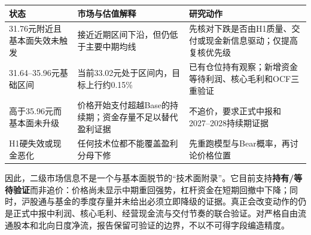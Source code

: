 \begin{exhibitbox}[价格、估值和验证事件的联合纪律]
\small
\begin{tabularx}{\exhibitboxwidth}{L{3.2cm}L{4.2cm}X}
\toprule
\textbf{状态} & \textbf{市场与估值解释} & \textbf{研究动作} \\
\midrule
31.76元附近且基本面失效未触发 & 接近近期区间下沿，但仍低于主要中期均线 & 先核对下跌是否由H1质量、交付或现金新信息驱动；仅提高复核优先级 \\
31.64--35.96元基础区间 & 当前33.02元处于区间内，目标上行约0.15\% & 已有仓位持有观察；新增资金等待利润、核心毛利和OCF三重验证 \\
高于35.96元而基本面未升级 & 价格开始支付超越Base的持续期；资金存量不足以替代盈利证据 & 不追价，要求正式中报和2027--2028持续期证据 \\
H1硬失效或现金恶化 & 任何技术位都不能覆盖盈利分母下修 & 先重跑模型与Bear概率，再讨论价格位置 \\
\bottomrule
\end{tabularx}
\end{exhibitbox}

因此，二级市场信息不是一个与基本面脱节的“技术面附录”。它目前支持\textbf{持有/等待验证}而非追价：价格尚未显示中期重回强势，杠杆资金在短期回撤中下降；同时，沪股通与基金的季度存量并未给出必须立即降级的证据。真正会改变动作的仍是正式中报中利润、核心毛利、经营现金流与交付节奏的联合验证。对严格自由流通股本和北向日度净流，报告保留可验证的边界，不以不可得字段编造精度。
